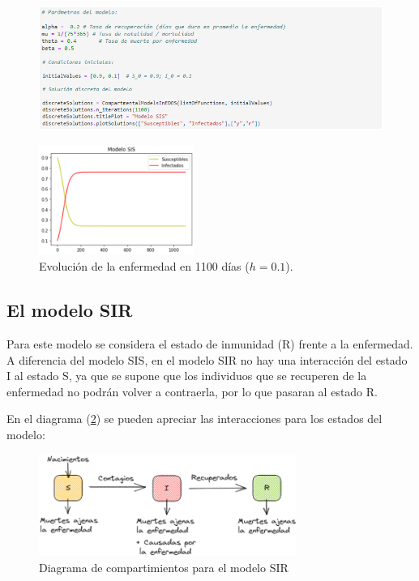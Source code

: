 \begin{figure}[h]
    \includegraphics[width=1\textwidth]{Imagenes/compartimentalModels2.png}
\end{figure}
    
\begin{figure}[h]
  \centering
    \includegraphics[width=0.45\textwidth]{Imagenes/ex1SIS.PNG}
  \caption{Evolución de la enfermedad en 1100 días ($h=0.1$).}
  \label{fig:Ejemplo 2 - SIS}
\end{figure}

\newpage

\subsection{El modelo SIR}\label{sub:modeloSIR}

Para este modelo se considera el estado de inmunidad (R) frente a la enfermedad. A diferencia del modelo SIS, en el modelo SIR no hay una interacción del estado I al estado S, ya que se supone que los individuos que se recuperen de la enfermedad no podrán volver a contraerla, por lo que pasaran al estado R. 

En el diagrama (\ref{fig:SIR}) se pueden apreciar las interacciones para los estados del modelo:

\begin{figure}[h]
  \centering
    \includegraphics[width=0.75\textwidth]{Imagenes/SIR_compartimientos.PNG}
  \caption{Diagrama de compartimientos para el modelo SIR}
  \label{fig:SIR}
\end{figure}

